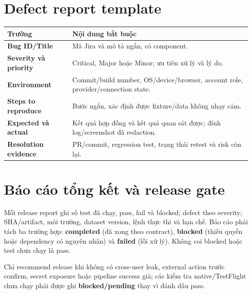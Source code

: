 \documentclass[12pt,a4paper]{article}
\begin{document}
\section{Defect report template}
\begin{tabularx}{\textwidth}{>{\bfseries}p{3.4cm}X}
\toprule Trường & Nội dung bắt buộc \\ \midrule
Bug ID/Title & Mã Jira và mô tả ngắn, có component. \\
Severity và priority & Critical, Major hoặc Minor; ưu tiên xử lý và lý do. \\
Environment & Commit/build number, OS/device/browser, account role, provider/connection state. \\
Steps to reproduce & Bước ngắn, xác định được fixture/data không nhạy cảm. \\
Expected và actual & Kết quả hợp đồng và kết quả quan sát được; đính log/screenshot đã redaction. \\
Resolution evidence & PR/commit, regression test, trạng thái retest và risk còn lại. \\
\bottomrule
\end{tabularx}

\section{Báo cáo tổng kết và release gate}
Mỗi release report ghi số test đã chạy, pass, fail và blocked; defect theo severity;
SHA/artifact, môi trường, dataset version, lệnh thực thi và hạn chế. Báo cáo phải
tách ba trường hợp: \textbf{completed} (đã xong theo contract), \textbf{blocked}
(thiếu quyền hoặc dependency có nguyên nhân) và \textbf{failed} (lỗi xử lý). Không
coi blocked hoặc test chưa chạy là pass.

\begin{warningbox}
Chỉ recommend release khi không có cross-user leak, external action trước confirm,
secret exposure hoặc pipeline success giả; các kiểm tra native/TestFlight chưa
chạy phải được ghi \textbf{blocked/pending} thay vì đánh dấu pass.
\end{warningbox}
\end{document}
